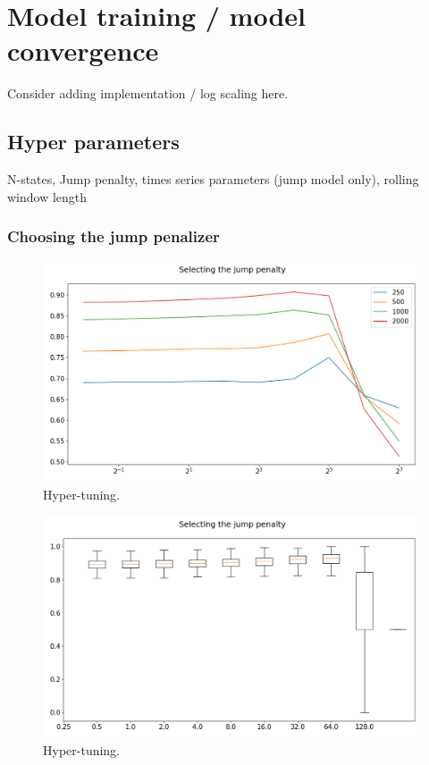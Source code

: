 \newpage

\section{Model training / model convergence}

Consider adding implementation / log scaling here.
 
\subsection{Hyper parameters}
 
N-states, Jump penalty, times series parameters (jump model only), rolling window length
 
\subsubsection{Choosing the jump penalizer}
\label{subsection: jump_penalizer}

\begin{figure}[H] 
    \centering
    \includegraphics[width=1\textwidth]{analysis/model_convergence/images/jump_penalties.png}
    \caption{Hyper-tuning.}
    \label{fig:jump_penalties}
\end{figure}

\begin{figure}[H] 
    \centering
    \includegraphics[width=1\textwidth]{analysis/model_convergence/images/jump_penalties_box.png}
    \caption{Hyper-tuning.}
\end{figure}


